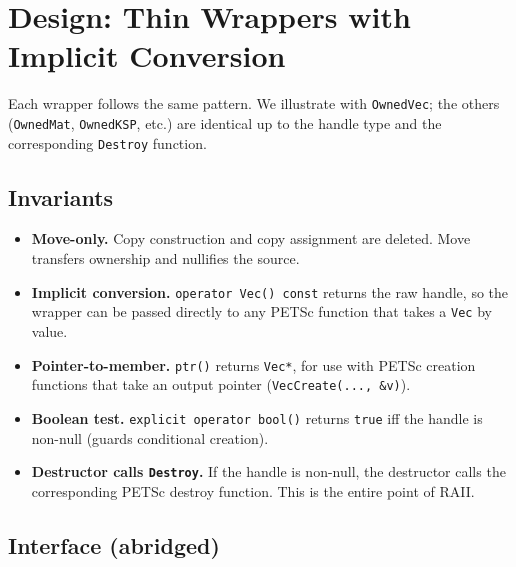 \section{Design: Thin Wrappers with Implicit Conversion}
\label{sec:phase0-design}

Each wrapper follows the same pattern.  We illustrate with \texttt{OwnedVec};
the others (\texttt{OwnedMat}, \texttt{OwnedKSP}, etc.) are identical up to
the handle type and the corresponding \texttt{Destroy} function.

\subsection{Invariants}

\begin{itemize}
  \item \textbf{Move-only.}  Copy construction and copy assignment are
        deleted.  Move transfers ownership and nullifies the source.
  \item \textbf{Implicit conversion.}  \texttt{operator Vec() const}
        returns the raw handle, so the wrapper can be passed directly to
        any PETSc function that takes a \texttt{Vec} by value.
  \item \textbf{Pointer-to-member.}  \texttt{ptr()} returns
        \texttt{Vec*}, for use with PETSc creation functions that take
        an output pointer (\texttt{VecCreate(..., \&v)}).
  \item \textbf{Boolean test.}  \texttt{explicit operator bool()} returns
        \texttt{true} iff the handle is non-null (guards conditional creation).
  \item \textbf{Destructor calls \texttt{Destroy}.}  If the handle is
        non-null, the destructor calls the corresponding PETSc destroy
        function.  This is the entire point of RAII.
\end{itemize}

\subsection{Interface (abridged)}

